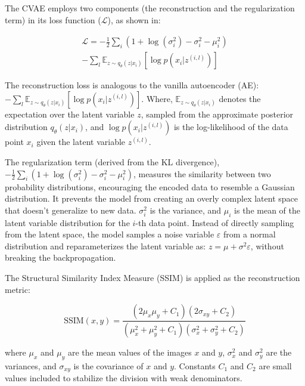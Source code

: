 \documentclass{IEEEcsmag}
\begin{document}
The CVAE employs two components (the reconstruction and the regularization term) in its loss function (\(\mathcal{L}\)), as shown in:

\begin{equation}
    \label{eq:loss}
    \begin{split}
    \mathcal{L}  = -\frac{1}{2} \sum_i \left(1 + \log(\sigma_i^2) - \sigma_i^2 - \mu_i^2 \right) \\ - \sum_l \mathbb{E}_{z \sim q_\theta(z|x_i)} \left[ \log p(x_i|z^{(i, l)}) \right]
    \end{split}
\end{equation}

The reconstruction loss is analogous to the vanilla autoencoder (AE): \(- \sum_l \mathbb{E}_{z \sim q_\theta(z|x_i)} \left[ \log p(x_i|z^{(i, l)}) \right]\). Where, \(\mathbb{E}_{z \sim q_\theta(z|x_i)}\) denotes the expectation over the latent variable \(z\), sampled from the approximate posterior distribution \(q_\theta(z|x_i)\), and \(\log p(x_i|z^{(i, l)})\) is the log-likelihood of the data point \(x_i\) given the latent variable \(z^{(i, l)}\).

The regularization term (derived from the KL divergence), \(-\frac{1}{2} \sum_i \left(1 + \log(\sigma_i^2) - \sigma_i^2 - \mu_i^2 \right)\), measures the similarity between two probability distributions, encouraging the encoded data to resemble a Gaussian distribution. It prevents the model from creating an overly complex latent space that doesn't generalize to new data. \(\sigma_i^2\) is the variance, and \(\mu_i\) is the mean of the latent variable distribution for the \(i\)-th data point. Instead of directly sampling from the latent space, the model samples a noise variable \(\varepsilon\) from a normal distribution and reparameterizes the latent variable as: \(z = \mu + \sigma^2 \varepsilon \), without breaking the backpropagation.

The Structural Similarity Index Measure (SSIM) is applied as the reconstruction metric:

\begin{equation}
    \label{eq:ssim}
    \text{SSIM}(x, y) = \frac{(2 \mu_x \mu_y + C_1)(2 \sigma_{xy} + C_2)}{(\mu_x^2 + \mu_y^2 + C_1)(\sigma_x^2 + \sigma_y^2 + C_2)}
\end{equation}

where $\mu_x$ and $\mu_y$ are the mean values of the images $x$ and $y$, $\sigma_x^2$ and $\sigma_y^2$ are the variances, and $\sigma_{xy}$ is the covariance of $x$ and $y$. Constants $C_1$ and $C_2$ are small values included to stabilize the division with weak denominators.
\end{document}
